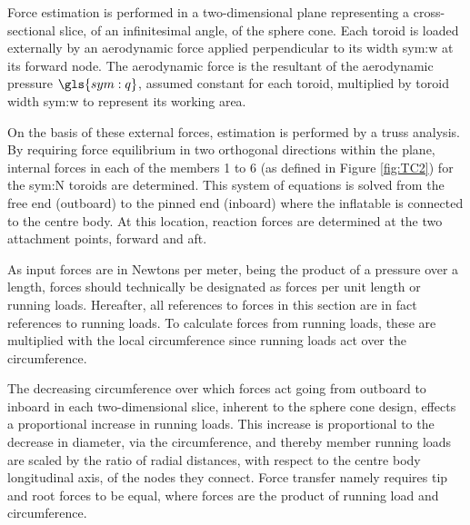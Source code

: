 Force estimation is performed in a two-dimensional plane representing a cross-sectional slice, of an infinitesimal angle, of the sphere cone. Each toroid is loaded externally by an aerodynamic force applied perpendicular to its width \gls{sym:w} at its forward node. The aerodynamic force is the resultant of the aerodynamic pressure $\gls{sym:q}$, assumed constant for each toroid, multiplied by toroid width \gls{sym:w} to represent its working area. 

On the basis of these external forces, estimation is performed by a truss analysis. By requiring force equilibrium in two orthogonal directions within the plane, internal forces in each of the members 1 to 6 (as defined in Figure \ref{fig:TC2}) for the \gls{sym:N} toroids are determined. This system of equations is solved from the free end (outboard) to the pinned end (inboard) where the inflatable is connected to the centre body. At this location, reaction forces are determined at the two attachment points, forward and aft.

As input forces are in Newtons per meter, being the product of a pressure over a length, forces should technically be designated as forces per unit length or running loads. Hereafter, all references to forces in this section are in fact references to running loads. To calculate forces from running loads, these are multiplied with the local circumference since running loads act over the circumference.

The decreasing circumference over which forces act going from outboard to inboard in each two-dimensional slice, inherent to the sphere cone design, effects a proportional increase in running loads. This increase is proportional to the decrease in diameter, via the circumference, and thereby member running loads are scaled by the ratio of radial distances, with respect to the centre body longitudinal axis, of the nodes they connect. Force transfer namely requires tip and root forces to be equal, where forces are the product of running load and circumference.

